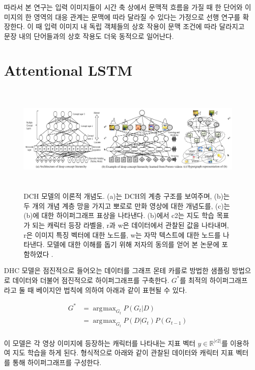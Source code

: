 \documentclass{kcc}
\DeclareMathOperator*{\argmax}{\arg\!\max}
\begin{document}
따라서 본 연구는 입력 이미지들이 시간 축 상에서 문맥적 흐름을 가질 때 한 단어와 이미지의 한 영역의 대응 관계는 문맥에 따라 달라질 수 있다는 가정으로 선행 연구를 확장한다. 이 때 입력 이미지 내 독립 객체들의 상호 작용이 문맥 조건에 따라 달라지고 문장 내의 단어들과의 상호 작용도 더욱 동적으로 일어난다. 

\section{Attentional LSTM}

\begin{figure}
  \centerline{\includegraphics[width=180mm,height=54mm]{eps/ha2015_fig2.png}}
  \caption{DCH 모델의 이론적 개념도. (a)는 DCH의 계층 구조를 보여주며, (b)는 두 개의 개념 계층 망을 가지고 뽀로로 만화 영상에 대한 개념도를, (c)는 (b)에 대한 하이퍼그래프 표상을 나타낸다. (b)에서 c2는 지도 학습 목표가 되는 캐릭터 등장 라벨을, r과 w은 데이터에서 관찰된 값을 나타내며, r은 이미지 특징 벡터에 대한 노드를, w는 자막 텍스트에 대한 노드를 나타낸다. 모델에 대한 이해를 돕기 위해 저자의 동의를 얻어 본 논문에 포함하였다 \cite{Ha2015}.}
  \label{fig:ha2015}
\end{figure}

DHC 모델은 점진적으로 들어오는 데이터를 그래프 몬테 카를로 방법한 샘플링 방법으로 데이터와 더불어 점진적으로 하이퍼그래프를 구축한다. $G^{*}$를 최적의 하이퍼그래프라고 둘 때 베이지안 법칙에 의하여 아래과 같이 표현될 수 있다.

\begin{equation} \label{eq1}
\begin{split}
G^{*} & = \argmax_{G_{t}} P(G_{t}|D) \\
      & = \argmax_{G_{t}} P(D|G_{t})P(G_{t-1}) \\
\end{split}
\end{equation}

이 모델은 각 영상 이미지에 등장하는 캐릭터를 나타내는 지표 벡터 $y \in \mathds{R}^{|c2|}$를 이용하여 지도 학습을 하게 된다. 형식적으로 아래와 같이 관찰된 데이터와 캐릭터 지표 벡터를 통해 하이퍼그래프를 구성한다.
\end{document}
